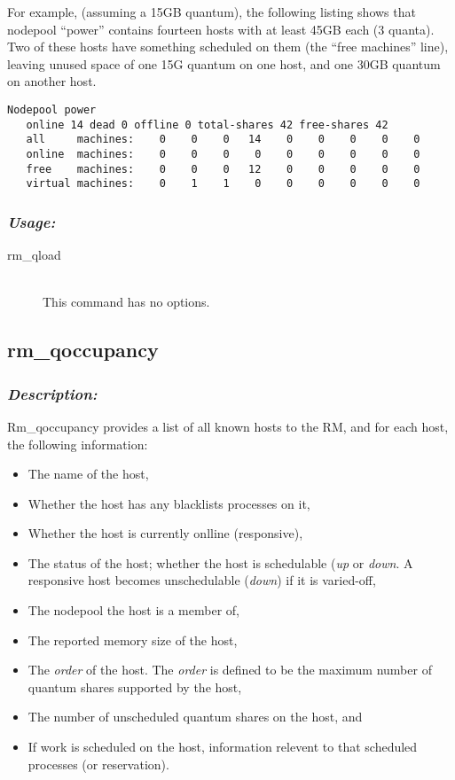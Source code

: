     For example, (assuming a 15GB quantum), the following listing shows
    that nodepool ``power'' contains fourteen hosts with at least 45GB each (3 quanta).  Two
    of these hosts have something scheduled on them (the ``free
    machines'' line), leaving unused space of one 15G quantum on one
    host, and one 30GB quantum on another host.

\begin{verbatim}
Nodepool power
   online 14 dead 0 offline 0 total-shares 42 free-shares 42
   all     machines:    0    0    0   14    0    0    0    0    0 
   online  machines:    0    0    0    0    0    0    0    0    0 
   free    machines:    0    0    0   12    0    0    0    0    0 
   virtual machines:    0    1    1    0    0    0    0    0    0 
\end{verbatim}

    \subsubsection{\em Usage:}
    \begin{description}
      \item[rm\_qload] \hfill \\ 
        This command has no options.
      \end{description}
             
       
\subsection{rm\_qoccupancy}
\label{subsec:admin.rm-qoccupancey}

    \subsubsection{{\em Description:}}
    Rm\_qoccupancy provides a list of all known hosts to the RM, and for each host, the following information:
    \begin{itemize}
      \item The name of the host,
      \item Whether the host has any blacklists processes on it,
      \item Whether the host is currently onlline (responsive),
      \item The status of the host; whether the host is schedulable ({\em up} or {\em down}.  A responsive host becomes
        unschedulable ({\em down}) if it is varied-off,
      \item The nodepool the host is a member of,
      \item The reported memory size of the host, 
      \item The {\em order} of the host.  The {\em order} is defined to be the maximum number of quantum shares
        supported by the host,
      \item The number of unscheduled quantum shares on the host, and
      \item If work is scheduled on the host, information relevent to that scheduled processes (or reservation).
    \end{itemize}

